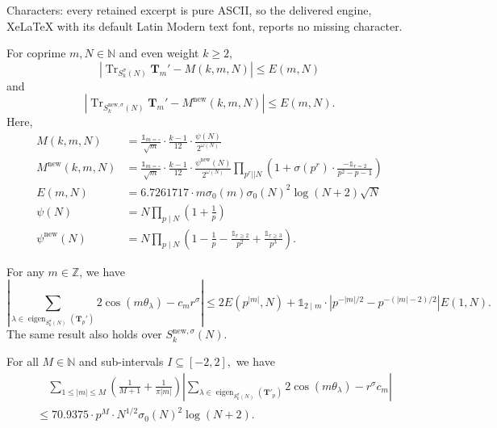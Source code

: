 \documentclass[10pt,a4paper]{amsart}
\newcommand{\eigen}{\operatorname{eigen}}
\newcommand{\nw}{\mathrm{new}}
\begin{document}
Characters: every retained excerpt is pure ASCII, so the delivered engine, XeLaTeX with its default Latin Modern text font, reports no missing character.
\begin{lemma}\label{lem:trace}
    For coprime $m, N \in \mathbb{N}$ and even weight $k \geq 2$,
    $$\left| \operatorname{Tr}_{S_k^\sigma(N)}\mathbf{T}_m' - M(k, m, N) \right| \leq E(m, N)$$
    and
    $$\left| \operatorname{Tr}_{S_k^{\nw, \sigma}(N)}\mathbf{T}_m' - M^{\nw}(k, m, N) \right| \leq E(m, N).$$
Here,
\begin{align*}
    M(k, m, N) &= \frac{\mathds{1}_{m = \square}}{\sqrt{m}} \cdot \frac{k - 1}{12} \cdot \frac{\psi(N)}{2^{\omega(N)}}\\
    M^{\nw}(k, m, N) &= \frac{\mathds{1}_{m = \square}}{\sqrt{m}} \cdot \frac{k - 1}{12} \cdot \frac{\psi^{\nw}(N)}{2^{\omega(N)}} \prod_{p^r || N} \left( 1 + \sigma(p^r) \cdot \frac{-\mathds{1}_{r = 2}}{p^2 - p - 1}  \right)\\
    E(m, N) &= 6.7261717 \cdot  m \sigma_0(m) \sigma_0(N)^2 \log(N + 2) \sqrt{N}\\
    \psi(N) &= N \prod_{p \mid N} \left(1 + \frac{1}{p} \right)\\
    \psi^{\nw}(N) &= N \prod_{p \mid N} \left(1 - \frac{1}{p} -  \frac{\mathds{1}_{r \geq 2}}{p^2} + \frac{\mathds{1}_{r \geq 3}}{p^3} \right).
\end{align*}
\end{lemma}

\begin{lemma} \label{lem:weyl-limits}
    For any $m \in \mathbb{Z}$, we have
    $$ \left| \sum_{\lambda \in \eigen_{S_k^\sigma(N)}(\mathbf{T}_p')} 2\cos(m\theta_\lambda) -c_m r^\sigma \right| \leq  2E(p^{|m|},N) + 
    \mathds{1}_{2 \mid m} \cdot \left| p^{-|m|/2} - p^{-(|m| - 2)/2} \right| E(1, N).
    $$
    The same result also holds over $S_k^{\nw, \sigma}(N).$
\end{lemma}

\begin{lemma}\label{lem:sum-upper-bound}
    For all $M \in \mathbb{N}$ and sub-intervals $I \subseteq [-2, 2],$ we have
    \begin{align}
    &\quad \sum_{1 \leq |m| \leq M} \left( \frac{1}{M + 1} + \frac{1}{\pi|m|} \right) \left| \sum_{\lambda \in \eigen_{S_k^\sigma(N)}(\mathbf{T}'_p)}  2\cos\left(m \theta_\lambda \right) - r^\sigma c_m \right| \label{eqn:sum-from-lemma-sum-upper-bound}\\
    &\le 70.9375 \cdot p^M \cdot N^{1/2} \sigma_0(N)^2\log(N + 2).
    \end{align}
\end{lemma}
\end{document}
